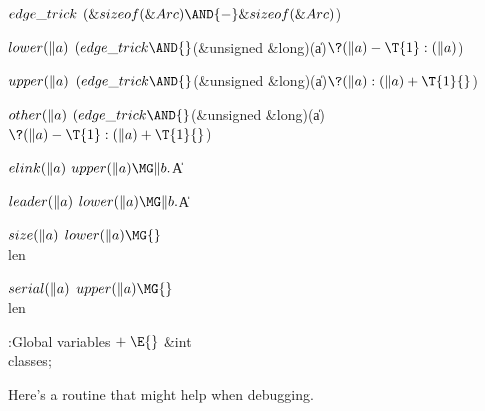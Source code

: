 \Y\B\4\D$\\{edge\_trick}$ \5
$(\&{sizeof}(\&{Arc})\AND{-}\&{sizeof}(\&{Arc}){}$)\par
\B\4\D$\\{lower}(\|a)$ \5
$(\\{edge\_trick}\AND{}$(\&{unsigned} \&{long})(\|a)${}\?(\|a)-\T{1}:(\|a){}$)%
\par
\B\4\D$\\{upper}(\|a)$ \5
$(\\{edge\_trick}\AND{}$(\&{unsigned} \&{long})(\|a)${}\?(\|a):(\|a)+\T{1}{}$)%
\par
\B\4\D$\\{other}(\|a)$ \5
$(\\{edge\_trick}\AND{}$(\&{unsigned} \&{long})(\|a)${}\?(\|a)-\T{1}:(\|a)+%
\T{1}{}$)\par
\B\4\D$\\{elink}(\|a)$ \5
$\\{upper}(\|a)\MG\|b.{}$\|A\par
\B\4\D$\\{leader}(\|a)$ \5
$\\{lower}(\|a)\MG\|b.{}$\|A\par
\B\4\D$\\{size}(\|a)$ \5
$\\{lower}(\|a)\MG{}$\\{len}\par
\B\4\D$\\{serial}(\|a)$ \5
$\\{upper}(\|a)\MG{}$\\{len}\par
\Y\B\4:Global variables\X${}\mathrel+\E{}$\6
\&{int} \\{classes};\par
\fi

Here's a routine that might help when debugging.

